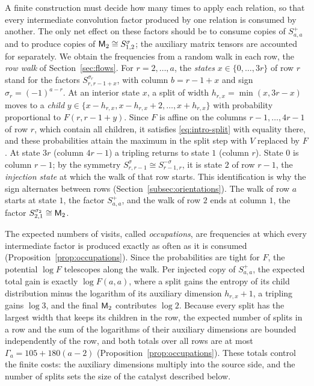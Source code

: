 A finite construction must decide how many times to apply each
relation, so that every intermediate convolution factor produced by one
relation is consumed by another. The only net effect on these factors
should be to consume copies of \(S^+_{a,a}\) and to produce copies of
\(\mathsf M_2\cong S^\sigma_{1,2}\); the auxiliary matrix tensors are accounted
for separately. We obtain the frequencies from a random walk in each
row, the \emph{row walk} of Section~\ref{sec:flows}. For
\(r=2,\ldots,a\), the \emph{states} \(x\in\{0,\ldots,3r\}\) of row \(r\)
stand for the factors \(S^{\sigma_r}_{r,r-1+x}\), with column
\(b=r-1+x\) and sign \(\sigma_r=(-1)^{a-r}\). At an interior state
\(x\), a split of width \(h_{r,x}=\min(x,3r-x)\) moves to a
\emph{child} \(y\in\{x-h_{r,x},x-h_{r,x}+2,\ldots,x+h_{r,x}\}\) with
probability proportional to \(F(r,r-1+y)\). Since \(F\) is affine on the
columns \(r-1,\ldots,4r-1\) of row \(r\), which contain all children, it
satisfies \eqref{eq:intro-split} with equality there, and these
probabilities attain the maximum in the split step with \(V\) replaced
by \(F\). At state \(3r\) (column \(4r-1\)) a tripling returns to state
\(1\) (column \(r\)). State \(0\) is column \(r-1\); by the symmetry
\(S^\sigma_{r,r-1}\cong S^{-\sigma}_{r-1,r}\), it is state \(2\) of row
\(r-1\), the \emph{injection state} at which the walk of that row
starts. This identification is why the sign alternates between rows
(Section~\ref{subsec:orientations}). The walk of row \(a\) starts at
state \(1\), the factor \(S^+_{a,a}\), and the walk of row \(2\) ends at
column \(1\), the factor \(S^{\sigma_2}_{2,1}\cong\mathsf M_2\).

The expected numbers of visits, called \emph{occupations}, are
frequencies at which every intermediate factor is produced exactly as
often as it is consumed (Proposition~\ref{prop:occupations}). Since the
probabilities are tight for \(F\), the potential \(\log F\) telescopes
along the walk. Per injected copy of \(S^+_{a,a}\), the expected total
gain is exactly \(\log F(a,a)\), where a split gains the entropy of its
child distribution minus the logarithm of its auxiliary dimension
\(h_{r,x}+1\), a tripling gains \(\log3\), and the final \(\mathsf M_2\)
contributes \(\log2\). Because every split has the largest width that
keeps its children in the row, the expected number of splits in a row
and the sum of the logarithms of their auxiliary dimensions are bounded
independently of the row, and both totals over all rows are at most
\(\Gamma_a=105+180(a-2)\) (Proposition~\ref{prop:occupations}). These
totals control the finite costs: the
auxiliary dimensions multiply into the source side, and the number of
splits sets the size of the catalyst described below.

